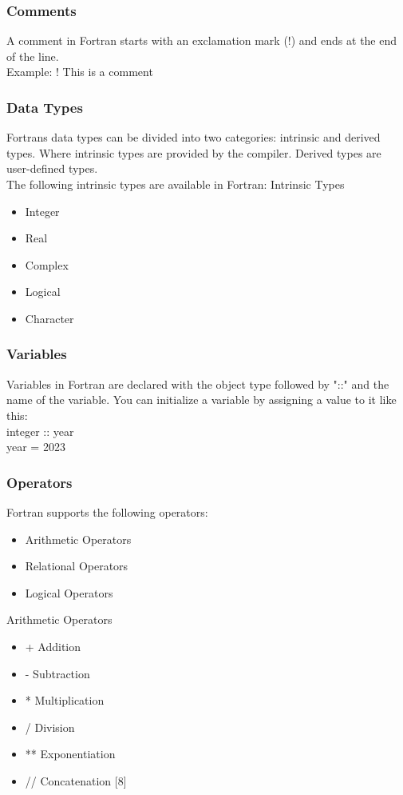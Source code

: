 \documentclass[12pt,a4paper]{scrartcl}
\begin{document}
\subsubsection{Comments}
A comment in Fortran starts with an exclamation mark (!) and ends at the end of the line.\\
Example:
! This is a comment\\

\subsubsection{Data Types}
Fortrans data types can be divided into two categories: intrinsic and derived types. Where intrinsic types are provided by the compiler. Derived types are user-defined types.\\
The following intrinsic types are available in Fortran:
Intrinsic Types
\begin{itemize}
\item Integer
\item Real
\item Complex
\item Logical
\item Character
\end{itemize}

\subsubsection{Variables}
Variables in Fortran are declared with the object type followed by "::" and the name of the variable.
You can initialize a variable by assigning a value to it like this:\\
integer :: year\\
year = 2023\\

\subsubsection{Operators}
Fortran supports the following operators:\\
\begin{itemize}
\item Arithmetic Operators
\item Relational Operators
\item Logical Operators
\end{itemize}

Arithmetic Operators
\begin{itemize}
\item + Addition
\item - Subtraction
\item * Multiplication
\item / Division
\item ** Exponentiation
\item // Concatenation [8]
\end{itemize}
\end{document}
